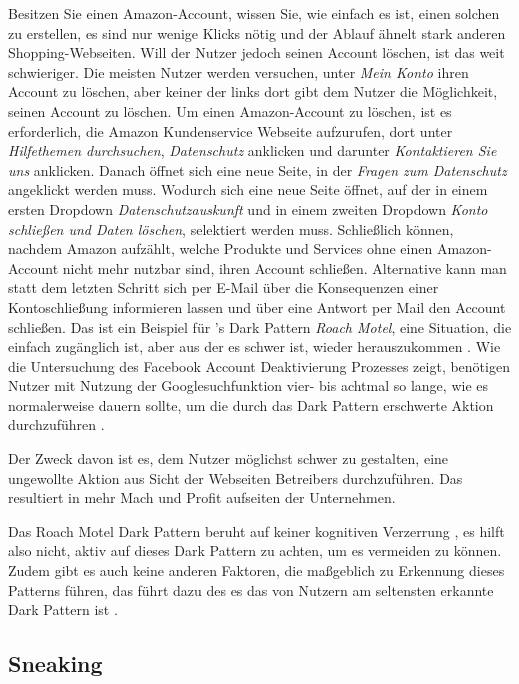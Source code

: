 \documentclass[conference,compsoc,final,a4paper]{IEEEtran}
\begin{document}
Besitzen Sie einen Amazon-Account, wissen Sie, wie einfach es ist, einen solchen zu erstellen, es sind nur wenige Klicks nötig und der Ablauf ähnelt stark anderen Shopping-Webseiten. Will der Nutzer jedoch seinen Account löschen, ist das weit schwieriger. Die meisten Nutzer werden versuchen, unter \textit{Mein Konto} ihren Account zu löschen, aber keiner der links dort gibt dem Nutzer die Möglichkeit, seinen Account zu löschen. Um einen Amazon-Account zu löschen, ist es erforderlich, die Amazon Kundenservice Webseite aufzurufen, dort unter \textit{Hilfethemen durchsuchen}, \textit{Datenschutz} anklicken und darunter \textit{Kontaktieren Sie uns} anklicken. Danach öffnet sich eine neue Seite, in der \textit{Fragen zum Datenschutz} angeklickt werden muss. Wodurch sich eine neue Seite öffnet, auf der in einem ersten Dropdown \textit{Datenschutzauskunft} und in einem zweiten Dropdown \textit{Konto schließen und Daten löschen}, selektiert werden muss. Schließlich können, nachdem Amazon aufzählt, welche Produkte und Services ohne einen Amazon-Account nicht mehr nutzbar sind, ihren Account schließen. Alternative kann man statt dem letzten Schritt sich per E-Mail über die Konsequenzen einer Kontoschließung informieren lassen und über eine Antwort per Mail den Account schließen. Das ist ein Beispiel für \citeauthor{Brignull}'s Dark Pattern \textit{Roach Motel}, eine Situation, die einfach zugänglich ist, aber aus der es schwer ist, wieder herauszukommen \autocite{Brignull}. Wie die Untersuchung des Facebook Account Deaktivierung Prozesses zeigt, benötigen Nutzer mit Nutzung der Googlesuchfunktion vier- bis achtmal so lange, wie es normalerweise dauern sollte, um die durch das Dark Pattern erschwerte Aktion durchzuführen \autocite{M.Bhoot2020}.

Der Zweck davon ist es, dem Nutzer möglichst schwer zu gestalten, eine ungewollte Aktion aus Sicht der Webseiten Betreibers durchzuführen. Das resultiert in mehr Mach und Profit aufseiten der Unternehmen.

Das Roach Motel Dark Pattern beruht auf keiner kognitiven Verzerrung \autocite{Mathur2019}, es hilft also nicht, aktiv auf dieses Dark Pattern zu achten, um es vermeiden zu können. Zudem gibt es auch keine anderen Faktoren, die maßgeblich zu Erkennung dieses Patterns führen, das führt dazu des es das von Nutzern am seltensten erkannte Dark Pattern ist \autocite{M.Bhoot2020}.



\subsection{Sneaking}
\end{document}
